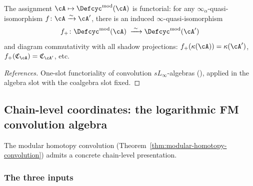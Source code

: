 \begin{corollary}
\label{cor:deformation-functoriality}
The assignment $\cA \mapsto \Defcyc^{\mathrm{mod}}(\cA)$ is
functorial: for any $\infty_\alpha$-quasi-isomorphism
$f\colon \cA \xrightarrow{\sim} \cA'$, there is an induced
$\infty$-quasi-isomorphism
\[
f_+\colon \Defcyc^{\mathrm{mod}}(\cA)
\;\xrightarrow{\;\sim\;}
\Defcyc^{\mathrm{mod}}(\cA')
\]
and diagram commutativity with all shadow projections:
$f_+(\kappa(\cA)) = \kappa(\cA')$,
$f_+(\mathfrak{C}_\cA) = \mathfrak{C}_{\cA'}$, etc.
\end{corollary}

\begin{proof}[References]
One-slot functoriality of convolution $sL_\infty$-algebras
(\cite[Theorem~5.1]{RNW19}), applied in the algebra slot with the
coalgebra slot fixed.
\end{proof}




\subsection{Chain-level coordinates: the logarithmic FM convolution algebra}
\label{subsec:three-preprints-chain-level}

The modular homotopy convolution
(Theorem~\ref{thm:modular-homotopy-convolution}) admits a concrete
chain-level presentation.

\subsubsection{The three inputs}


